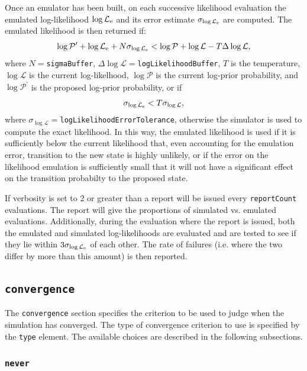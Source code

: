 Once an emulator has been built, on each successive likelihood evaluation the emulated log-likelihood $\log\mathcal{L}_{\rm e}$ and its error estimate $\sigma_{\log\mathcal{L}_{\rm e}}$ are computed. The emulated likelihood is then returned if:
\begin{equation}
\log\mathcal{P}^\prime + \log\mathcal{L}_{\rm e} + N \sigma_{\log\mathcal{L}_{\rm e}} < \log\mathcal{P} + \log\mathcal{L} - T \Delta\log\mathcal{L},
\end{equation}
where $N=${\tt sigmaBuffer}, $\Delta\log\mathcal{L}=${\tt logLikelihoodBuffer}, $T$ is the temperature, $\log\mathcal{L}$ is the current log-likelhood, $\log\mathcal{P}$ is the current log-prior probability, and $\log\mathcal{P}^\prime$ is the proposed log-prior probability, or if
\begin{equation}
\sigma_{\log\mathcal{L}_{\rm e}} < T \sigma_{\log\mathcal{L}},
\end{equation}
where $\sigma_{\log\mathcal{L}}=${\tt logLikelihoodErrorTolerance}, otherwise the simulator is used to compute the exact likelihood. In this way, the emulated likelihood is used if it is sufficiently below the current likelihood that, even accounting for the emulation error, transition to the new state is highly unlikely, or if the error on the likelihood emulation is sufficiently small that it will not have a significant effect on the transition probabilty to the proposed state.

If verbosity is set to 2 or greater than a report will be issued every {\tt reportCount} evaluations. The report will give the proportions of simulated vs. emulated evaluations. Additionally, during the evaluation where the report is issued, both the emulated and simulated log-likelihoods are evaluated and are tested to see if they lie within $3 \sigma_{\log\mathcal{L}_{\rm e}}$ of each other. The rate of failures (i.e. where the two differ by more than this amount) is then reported.

\subsection{{\tt convergence}}

The {\tt convergence} section specifies the criterion to be used to judge when the simulation has converged. The type of convergence criterion to use is specified by the {\tt type} element. The available choices are described in the following subsections.

\subsubsection{{\tt never}}

